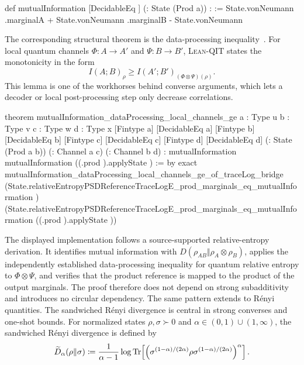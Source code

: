 \documentclass[10pt,a4paper]{article}
\DeclareRobustCommand{\LeanQIT}{\textnormal{\textsc{Lean-QIT}}}
\newif\ifqitLineFocused
\newcommand{\qitHighlightSpan}[2]{%
	\ifnum\value{lstnumber}<#1\relax
	\else
		\ifnum\value{lstnumber}>#2\relax
		\else
			\qitLineFocusedtrue
		\fi
	\fi
}
\begin{document}
\begin{qitleancode}[title={Mutual information}]
def mutualInformation [DecidableEq \iota] (\rho : State (Prod \iota a)) : \mathbbR :=
  State.vonNeumann \rho.marginalA + State.vonNeumann \rho.marginalB
    - State.vonNeumann \rho
\end{qitleancode}
	
	The corresponding structural theorem is the data-processing inequality~\cite{Wilde2017}.  For
	local quantum channels $\Phi:A\to A'$ and $\Psi:B\to B'$, \LeanQIT{}
	states the monotonicity in the form
	\begin{equation}
		I(A;B)_\rho
		\ge
		I(A';B')_{(\Phi\otimes\Psi)(\rho)} .
	\end{equation}
	This lemma is one of the workhorses behind converse arguments, which lets a decoder or local post-processing step only decrease correlations.
	
\begin{qitleancode}[title={Data processing under local channels},
qit focus={\qitHighlightSpan{6}{7}}]
theorem mutualInformation_dataProcessing_local_channels_ge
    {a : Type u} {b : Type v} {c : Type w} {d : Type x}
    [Fintype a] [DecidableEq a] [Fintype b] [DecidableEq b]
    [Fintype c] [DecidableEq c] [Fintype d] [DecidableEq d]
    (\rho : State (Prod a b)) (\Phi : Channel a c) (\Psi : Channel b d) :
    mutualInformation \rho \ge
      mutualInformation ((\Phi.prod \Psi).applyState \rho) := by
  exact
    mutualInformation_dataProcessing_local_channels_ge_of_traceLog_bridge \rho \Phi \Psi
      (State.relativeEntropyPSDReferenceTraceLogE_prod_marginals_eq_mutualInformation \rho)
      (State.relativeEntropyPSDReferenceTraceLogE_prod_marginals_eq_mutualInformation
        ((\Phi.prod \Psi).applyState \rho))
\end{qitleancode}
	
The displayed implementation follows a source-supported relative-entropy derivation.  It identifies mutual information with $D(\rho_{AB}\Vert\rho_A\otimes\rho_B)$, applies the independently established data-processing inequality for quantum relative entropy to
$\Phi\otimes\Psi$, and verifies that the product reference is mapped to the
product of the output marginals.  The proof therefore does not depend on
strong subadditivity and introduces no circular dependency. The same pattern extends to R\'enyi quantities.  The sandwiched R\'enyi divergence is central in strong converses and one-shot bounds.  For normalized states $\rho,\sigma\succ0$ and $\alpha\in(0,1)\cup(1,\infty)$, the sandwiched R\'enyi divergence is defined by~\cite{M_ller_Lennert_2013,Wilde2014}
	\begin{equation}
			\widetilde D_\alpha(\rho\Vert\sigma)
			\coloneqq\frac{1}{\alpha-1}
			\log\operatorname{Tr}\!\left[
			\left(\sigma^{(1-\alpha)/(2\alpha)}
			\rho\sigma^{(1-\alpha)/(2\alpha)}\right)^\alpha
			\right].
	\end{equation}
	
\end{document}
